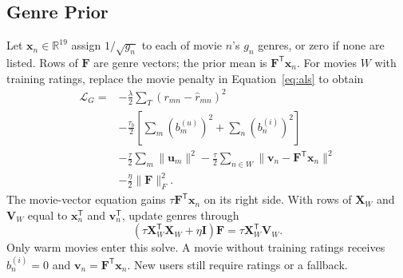 \subsection{Genre Prior}
Let $\mathbf x_n\in\mathbb R^{19}$ assign $1/\sqrt{g_n}$ to each of movie $n$'s $g_n$ genres, or zero if none are listed. Rows of $\mathbf F$ are genre vectors; the prior mean is $\mathbf F^{\mathsf T}\mathbf x_n$. For movies $W$ with training ratings, replace the movie penalty in Equation~\ref{eq:als} to obtain
\begin{align}
\mathcal L_G={}&-\frac{\lambda}{2}\sum_T(r_{mn}-\widehat r_{mn})^2\nonumber\\
&-\frac{\tau_b}{2}\left[\sum_m(b_m^{(u)})^2+\sum_n(b_n^{(i)})^2\right]\nonumber\\
&-\frac{\tau}{2}\sum_m\|\mathbf u_m\|^2
-\frac{\tau}{2}\sum_{n\in W}\|\mathbf v_n-\mathbf F^{\mathsf T}\mathbf x_n\|^2\nonumber\\
&-\frac{\eta}{2}\|\mathbf F\|_F^2.
\label{eq:genre}
\end{align}
The movie-vector equation gains $\tau\mathbf F^{\mathsf T}\mathbf x_n$ on its right side. With rows of $\mathbf X_W$ and $\mathbf V_W$ equal to $\mathbf x_n^{\mathsf T}$ and $\mathbf v_n^{\mathsf T}$, update genres through
\begin{equation}
(\tau\mathbf X_W^{\mathsf T}\mathbf X_W+\eta\mathbf I)\mathbf F
=\tau\mathbf X_W^{\mathsf T}\mathbf V_W.
\label{eq:feature-solve}
\end{equation}
Only warm movies enter this solve. A movie without training ratings receives $b_n^{(i)}=0$ and $\mathbf v_n=\mathbf F^{\mathsf T}\mathbf x_n$. New users still require ratings or a fallback.
